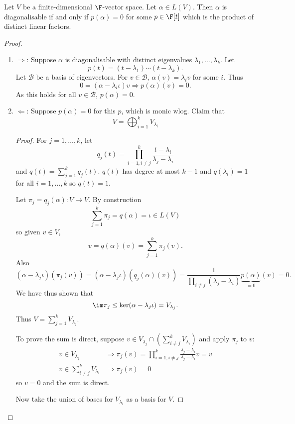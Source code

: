 \documentclass[a4paper]{article}
\newcommand*{\basis}{\mathcal}
\theoremstyle{definition}
\begin{document}
\begin{theorem}
  Let \(V\) be a finite-dimensional \(\F\)-vector space. Let \(\alpha \in L(V)\). Then \(\alpha\) is diagonalisable if and only if \(p(\alpha) = 0\) for some \(p \in \F[t]\) which is the product of distinct linear factors.
\end{theorem}

\begin{proof}\leavevmode
  \begin{enumerate}
  \item \(\Rightarrow\): Suppose \(\alpha\) is diagonalisable with distinct eigenvalues \(\lambda_1, \dots, \lambda_k\). Let
    \[
      p(t) = (t - \lambda_1) \cdots (t - \lambda_k).
    \]
    Let \(\basis B\) be a basis of eigenvectors. For \(v \in \basis B\), \(\alpha(v) = \lambda_i v\) for some \(i\). Thus
    \[
      0 = (\alpha - \lambda_i \iota) v \Rightarrow p(\alpha)(v) = 0.
    \]
    As this holds for all \(v \in \basis B\), \(p(\alpha) = 0\).
  \item \(\Leftarrow\): Suppose \(p(\alpha) = 0\) for this \(p\), which is monic wlog. Claim that
    \[
      V = \bigoplus_{i = 1}^k V_{\lambda_i}
    \]
    \begin{proof}
      For \(j = 1, \dots, k\), let
      \[
        q_j(t) = \prod_{i = 1, i \neq j}^k \frac{t - \lambda_i}{\lambda_j - \lambda_i}
      \]
      and \(q(t) = \sum_{j = 1}^k q_j(t)\). \(q(t)\) has degree at most \(k - 1\) and \(q(\lambda_i) = 1\) for all \(i = 1, \dots, k\) so \(q(t) = 1\).

      Let \(\pi_j = q_j(\alpha): V \to V\). By construction
      \[
        \sum_{j = 1}^{k} \pi_j = q(\alpha) = \iota \in L(V)
      \]
      so given \(v \in V\),
      \[
        v = q(\alpha) (v) = \sum_{j = 1}^{k} \pi_j(v).
      \]
      Also
      \[
        (\alpha - \lambda_j \iota)(\pi_j(v)) = (\alpha - \lambda_j\iota)(q_j(\alpha)(v)) = \frac{1}{\prod_{i \neq j}^{ } (\lambda_j - \lambda_i)} \underbrace{p(\alpha)}_{= 0}(v) = 0.
      \]
      We have thus shown that
      \[
        \im \pi_j \leq \ker(\alpha - \lambda_j \iota) = V_{\lambda_j}.
      \]
      Thus \(V = \sum_{j = 1}^{k} V_{\lambda_j}\).

      To prove the sum is direct, suppose \(v \in V_{\lambda_j} \cap (\sum_{i \neq j}^k V_{\lambda_i})\) and apply \(\pi_j\) to \(v\):
      \begin{align*}
        v \in V_{\lambda_j} &\Rightarrow \pi_j(v) = \prod_{i = 1, i \neq j}^{k} \frac{\lambda_j - \lambda_i}{\lambda_j - \lambda_i} v = v \\
        v \in \sum_{i \neq j}^{k}V_{\lambda_i} &\Rightarrow \pi_j(v) = 0
      \end{align*}
        so \(v = 0\) and the sum is direct.

        Now take the union of bases for \(V_{\lambda_i}\) as a basis for \(V\).
    \end{proof}
  \end{enumerate}
\end{proof}
\end{document}
